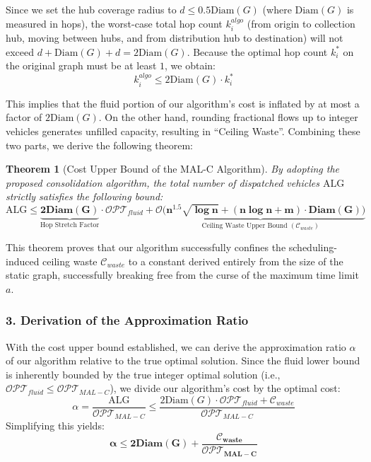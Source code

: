 \documentclass[12pt, a4paper]{article}
\newtheorem{theorem}{Theorem}
\begin{document}
Since we set the hub coverage radius to $d \le 0.5\text{Diam}(G)$ (where $\text{Diam}(G)$ is measured in hops), the worst-case total hop count $k_i^{algo}$ (from origin to collection hub, moving between hubs, and from distribution hub to destination) will not exceed $d + \text{Diam}(G) + d = 2\text{Diam}(G)$. Because the optimal hop count $k_i^*$ on the original graph must be at least $1$, we obtain:
\begin{equation}
    k_i^{algo} \le 2\text{Diam}(G) \cdot k_i^*
\end{equation}

This implies that the fluid portion of our algorithm's cost is inflated by at most a factor of $2\text{Diam}(G)$. On the other hand, rounding fractional flows up to integer vehicles generates unfilled capacity, resulting in ``Ceiling Waste''. Combining these two parts, we derive the following theorem:

\begin{theorem}[Cost Upper Bound of the MAL-C Algorithm]
By adopting the proposed consolidation algorithm, the total number of dispatched vehicles $\text{ALG}$ strictly satisfies the following bound:
\begin{equation}
    \text{ALG} \le \underbrace{\mathbf{2\text{Diam}(G)}}_{\text{Hop Stretch Factor}} \cdot \mathcal{OPT}_{fluid} + \underbrace{\mathbf{\mathcal{O} \Big( n^{1.5}\sqrt{\log n} + (n \log n + m) \cdot \text{Diam}(G) \Big)}}_{\text{Ceiling Waste Upper Bound } (\mathcal{C}_{waste})}
\end{equation}
\end{theorem}
This theorem proves that our algorithm successfully confines the scheduling-induced ceiling waste $\mathcal{C}_{waste}$ to a constant derived entirely from the size of the static graph, successfully breaking free from the curse of the maximum time limit $a$.

\subsubsection*{3. Derivation of the Approximation Ratio}

With the cost upper bound established, we can derive the approximation ratio $\alpha$ of our algorithm relative to the true optimal solution. Since the fluid lower bound is inherently bounded by the true integer optimal solution (i.e., $\mathcal{OPT}_{fluid} \le \mathcal{OPT}_{MAL-C}$), we divide our algorithm's cost by the optimal cost:
\begin{equation}
    \alpha = \frac{\text{ALG}}{\mathcal{OPT}_{MAL-C}} \le \frac{2\text{Diam}(G) \cdot \mathcal{OPT}_{fluid} + \mathcal{C}_{waste}}{\mathcal{OPT}_{MAL-C}}
\end{equation}
Simplifying this yields:
\begin{equation}
    \mathbf{\alpha \le 2\text{Diam}(G) + \frac{\mathcal{C}_{waste}}{\mathcal{OPT}_{MAL-C}}}
\end{equation}
\end{document}
